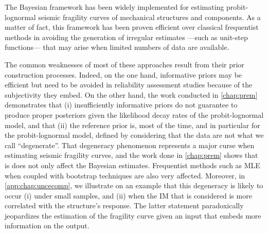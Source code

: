 

The Bayesian framework has been widely implemented for estimating probit-lognormal seismic fragility curves of mechanical structures and components. %
As a matter of fact, this framework has been proven efficient over classical frequentist methods in avoiding the generation of irregular estimates ---such as unit-step functions--- that may arise when limited numbers of data are available.

The common 
weaknesses of most of these approaches result from  %
their prior construction processes.  
Indeed, on the one hand, informative priors may be efficient but need to be 
avoided in reliability assessment studies because of the subjectivity they embed.
On the other hand, the work conducted in   \cref{chap:prem} demonstrates that (i) insufficiently informative priors do not guarantee to produce proper posteriors given the likelihood decay rates of the probit-lognormal model, and that (ii)  
the reference prior is, most of the time, and in particular for the probit-lognormal model, defined by considering that the data are not what we call ``degenerate''. %
%
That degeneracy phenomenon represents a major curse when estimating seismic fragility curves, and the work done in   \cref{chap:prem} shows that is does not only affect the Bayesian estimates. Frequentist methods such as MLE when coupled with bootstrap techniques are also very affected.
Moreover, in   \cref{app:chap:uncecomp}, we illustrate on an example that this degeneracy is likely to occur (i) under small samples, and (ii) when the IM that is considered is more correlated with the structure's response.
The latter statement paradoxically jeopardizes the estimation of the fragility curve given an input that embeds more information on the output. %









